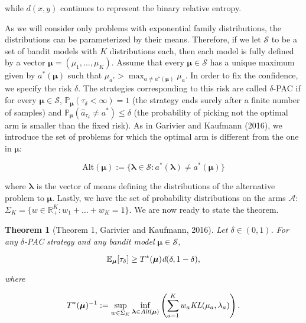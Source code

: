 \documentclass[12pt,]{article}
\newtheorem{theorem}{Theorem}
\begin{document}
while \(d(x,y)\) continues to represent the binary relative entropy.

As we will consider only problems with exponential family distributions,
the distributions can be parameterized by their means. Therefore, if we
let \(\mathcal{S}\) to be a set of bandit models with \(K\)
distributions each, then each model is fully defined by a vector
\(\bm{\mu} = (\mu_1, \dots, \mu_K)\). Assume that every
\(\bm{\mu} \in \mathcal{S}\) has a unique maximum given by
\(a^*(\bm{\mu})\) such that
\(\mu_{a^*} > \max_{a \neq a^*(\bm{\mu})} \mu_a\). In order to fix the
confidence, we specify the risk \(\delta\). The strategies corresponding
to this risk are called \(\delta\)-PAC if for every
\(\bm{\mu} \in \mathcal{S}\),
\(\mathbb{P}_{\bm{\mu}}(\tau_{\delta} < \infty) = 1\) (the strategy ends
surely after a finite number of samples) and
\(\mathbb{P}_{\bm{\mu}}(\hat{a}_{\tau_{\delta}} \neq a^*) \leq \delta\)
(the probability of picking not the optimal arm is smaller than the
fixed risk). As in Garivier and Kaufmann (2016), we introduce the set of
problems for which the optimal arm is different from the one in
\(\bm{\mu}\):

\begin{equation*}
\text{Alt}(\bm{\mu}) := \{\bm{\lambda} \in \mathcal{S}: a^*(\bm{\lambda}) \neq a^*(\bm{\mu})\}
\end{equation*}

where \(\bm{\lambda}\) is the vector of means defining the distributions
of the alternative problem to \(\bm{\mu}\). Lastly, we have the set of
probability distributions on the arms \(\mathcal{A}\):
\(\Sigma_K = \{w \in \mathbb{R}_{+}^K: w_1 + \dots + w_K = 1\}\).
We are now ready to state the theorem.

\begin{theorem}[Theorem 1, Garivier and Kaufmann, 2016] \label{theorem:GarivierKaufmannTheorem1}
Let $\delta \in (0,1)$. For any $\delta$-PAC strategy and any bandit model $\bm{\mu} \in \mathcal{S}$,

\begin{equation*}
\mathbb{E}_{\bm{\mu}} [\tau_{\delta}] \geq T^*(\bm{\mu}) \text{\em{d}}(\delta,1-\delta),
\end{equation*}

where 

\begin{equation} \label{eq:GarivierKaufmann_Theorem1_Game}
T^*(\bm{\mu})^{-1} := \sup_{w \in \Sigma_K} \inf_{\bm{\lambda} \in \text{\em{Alt}}(\bm{\mu})} \left( \sum_{a=1}^K w_a \text{\em{KL}}(\mu_a, \lambda_a)\right) .
\end{equation}
\end{theorem}
\end{document}
